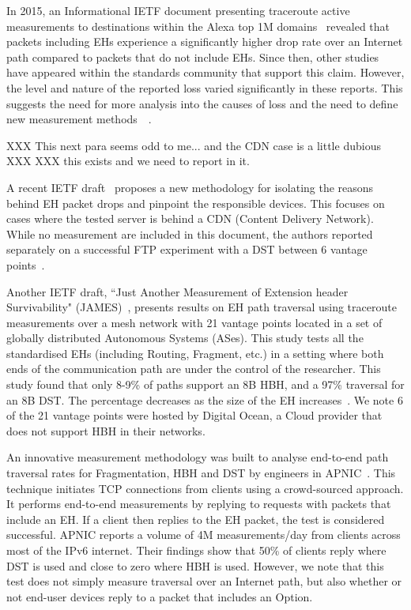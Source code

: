 \documentclass[conference]{IEEEtran}
\begin{document}
In 2015, an Informational IETF document presenting traceroute active
measurements to destinations within the Alexa top 1M domains~\cite{RFC7872}
revealed that packets including EHs experience a significantly higher drop rate over an
Internet path compared to packets that do not include EHs. Since then, other
studies~\cite{james}~\cite{nalini-iepg114}~\cite{apnic} have appeared within the standards community that support this claim.  However,
the level and nature of the reported loss varied significantly in these
reports.  This suggests the need for more analysis into the causes of loss and the need to define new measurement methods~\cite{james}~\cite{elkins-v6ops-eh-deepdive-fw-01}.  

XXX This next para seems odd to me... and the CDN case is a little dubious XXX
XXX  this exists and we need to report in it.

A recent IETF draft~\cite{elkins-v6ops-eh-deepdive-fw-01} proposes a new
methodology for isolating the reasons behind EH packet drops and pinpoint the
responsible devices. This focuses on cases where the tested
server is behind a CDN (Content Delivery Network).  While no measurement are included in this document, the authors reported separately on a successful FTP experiment with a DST between 6 vantage points~\cite{nalini-iepg114}.

Another IETF draft, ``Just Another Measurement of Extension header
Survivability" (JAMES)~\cite{james}, presents results on EH path traversal using
traceroute measurements over a mesh network with 21 vantage points located in a set of globally distributed Autonomous Systems (ASes). This study tests all the standardised EHs
(including Routing, Fragment, etc.) in a setting where both ends of the
communication path are under the control of the researcher.  This study found
that only 8-9\% of paths support an 8B HBH, and a 97\% traversal for an 8B
DST. The percentage decreases as the size of the EH
increases~\cite{james-imc}.  We note 6 of the 21 vantage points were
hosted by Digital Ocean\texttrademark, a Cloud provider that does not support
HBH in their networks.

An innovative measurement methodology was built to analyse end-to-end path traversal
rates for Fragmentation, HBH and DST by engineers in APNIC~\cite{apnic}.  This technique initiates TCP connections from clients using a crowd-sourced approach. It performs 
end-to-end measurements by replying to requests with packets that include an EH. If a client then replies to the EH packet, the test is considered successful.  
APNIC reports a volume of 4M measurements/day from clients across most of the IPv6 internet. 
Their findings show that 50\%  of clients reply where DST is used and close to zero where HBH is used.
However, we note that this test does not simply measure traversal over an Internet path, but also whether or not end-user devices reply to a packet that includes an Option. 
\end{document}

